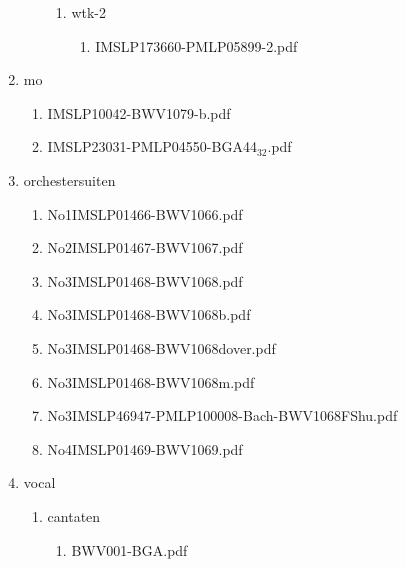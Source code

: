 \documentclass[11pt]{article}
\begin{document}
\begin{enumerate}
\begin{enumerate}
\begin{enumerate}
\item wtk-2
\label{sec-1-1-1-1-44-6-4-2-15}
\begin{enumerate}
\item IMSLP173660-PMLP05899-2.pdf
\label{sec-1-1-1-1-44-6-4-2-15-1}
\end{enumerate}
\end{enumerate}
\end{enumerate}

\item mo
\label{sec-1-1-1-1-44-6-5}
\begin{enumerate}
\item IMSLP10042-BWV1079-b.pdf
\label{sec-1-1-1-1-44-6-5-1}

\item IMSLP23031-PMLP04550-BGA44$_{\text{32}}$.pdf
\label{sec-1-1-1-1-44-6-5-2}
\end{enumerate}

\item orchestersuiten
\label{sec-1-1-1-1-44-6-6}
\begin{enumerate}
\item No1IMSLP01466-BWV1066.pdf
\label{sec-1-1-1-1-44-6-6-1}

\item No2IMSLP01467-BWV1067.pdf
\label{sec-1-1-1-1-44-6-6-2}

\item No3IMSLP01468-BWV1068.pdf
\label{sec-1-1-1-1-44-6-6-3}

\item No3IMSLP01468-BWV1068b.pdf
\label{sec-1-1-1-1-44-6-6-4}

\item No3IMSLP01468-BWV1068dover.pdf
\label{sec-1-1-1-1-44-6-6-5}

\item No3IMSLP01468-BWV1068m.pdf
\label{sec-1-1-1-1-44-6-6-6}

\item No3IMSLP46947-PMLP100008-Bach-BWV1068FShu.pdf
\label{sec-1-1-1-1-44-6-6-7}

\item No4IMSLP01469-BWV1069.pdf
\label{sec-1-1-1-1-44-6-6-8}
\end{enumerate}

\item vocal
\label{sec-1-1-1-1-44-6-7}
\begin{enumerate}
\item cantaten
\label{sec-1-1-1-1-44-6-7-1}
\begin{enumerate}
\item BWV001-BGA.pdf
\label{sec-1-1-1-1-44-6-7-1-1}


\end{enumerate}
\end{enumerate}
\end{enumerate}
\end{document}
